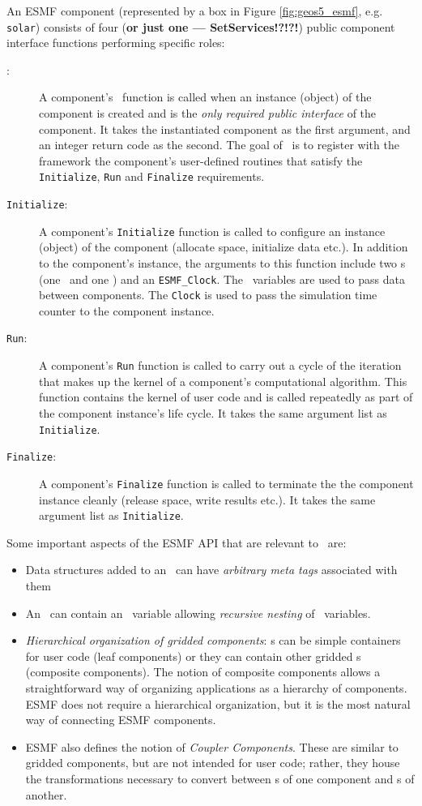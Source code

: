 An ESMF component (represented by a box in Figure \ref{fig:geos5_esmf},
e.g. \texttt{solar}) consists of four (\textbf{or just one --- SetServices!?!?!}) public component interface functions
performing specific roles:
\begin{description}
\item[\ssv:] A component's \ssv\ function is called when an
instance (object) of the component is created and is the \emph{only required
public interface} of the component. It takes the instantiated component as
the first argument, and an integer return code as the second. The goal of
\ssv\ is to register with the framework the component's user-defined routines
that satisfy the \texttt{Initialize}, \texttt{Run} and \texttt{Finalize}
requirements.
\item[\texttt{Initialize}:] A component's \texttt{Initialize} function
is called to configure an instance (object) of the component (allocate
space, initialize data etc.). In addition to
the component's instance, the arguments to this function include two
\stt s (one \im\ and one \ex) and an \texttt{ESMF\_Clock}. The \stt\
variables are used to pass data between components. The
\texttt{Clock} is used to pass the simulation time counter to the component
instance.
\item[\texttt{Run}:] A component's \texttt{Run} function is called to
carry out a cycle of the iteration that makes up the kernel of a component's
computational algorithm. This function contains the kernel of user code
and is called repeatedly as part of the
component instance's life cycle. It takes the same argument list as
\texttt{Initialize}.
\item[\texttt{Finalize}:] A component's \texttt{Finalize} function is
called to terminate the the component instance cleanly (release space,
write results etc.). It takes the same argument list as \texttt{Initialize}.
\end{description}

Some important aspects of the ESMF API that are relevant to
\ggn\ are:
%
\begin{itemize}
\item Data structures added to an \stt\ can have \emph{arbitrary meta tags}
  associated with them
\item An \stt\ can contain an \stt\ variable allowing \emph{recursive nesting}
  of \stt\ variables.
\item \emph{Hierarchical organization of gridded components}: \egc s can be
simple containers for user code (leaf components) or they can contain other
gridded \egc s (composite components). The notion of composite components
allows a straightforward way of organizing applications as a hierarchy of
components. ESMF does not require a hierarchical organization, but it is
the most natural way of connecting ESMF components.
\item ESMF also defines the notion of \emph{Coupler Components}.
These are similar to gridded components, but are not intended for user code;
rather, they house the transformations necessary to convert between \ex s
of one component and \im s of another.
\end{itemize}

